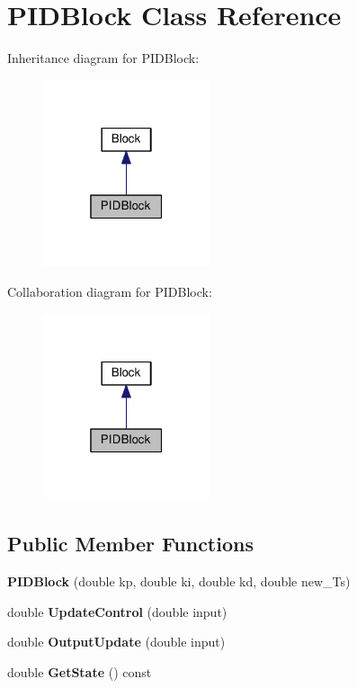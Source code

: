 \hypertarget{classPIDBlock}{}\section{P\+I\+D\+Block Class Reference}
\label{classPIDBlock}


Inheritance diagram for P\+I\+D\+Block\+:
\nopagebreak
\begin{figure}[H]
\begin{center}
\leavevmode
\includegraphics[width=139pt]{classPIDBlock__inherit__graph}
\end{center}
\end{figure}


Collaboration diagram for P\+I\+D\+Block\+:
\nopagebreak
\begin{figure}[H]
\begin{center}
\leavevmode
\includegraphics[width=139pt]{classPIDBlock__coll__graph}
\end{center}
\end{figure}
\subsection*{Public Member Functions}
\begin{DoxyCompactItemize}
\item 
\mbox{\label{classPIDBlock_a9ec4d61a225f114a32640d2007b35ca8}} 
{\bfseries P\+I\+D\+Block} (double kp, double ki, double kd, double new\+\_\+\+Ts)
\item 
\mbox{\label{classPIDBlock_a69d4c97d0b72eb2d650b5973b3a70073}} 
double {\bfseries Update\+Control} (double input)
\item 
\mbox{\label{classPIDBlock_aa17a548fbbd21bbc5252c0a07a196dc2}} 
double {\bfseries Output\+Update} (double input)
\item 
\mbox{\label{classPIDBlock_a88dc6380a6a8ddb92143f269f1af9adc}} 
double {\bfseries Get\+State} () const
\end{DoxyCompactItemize}
